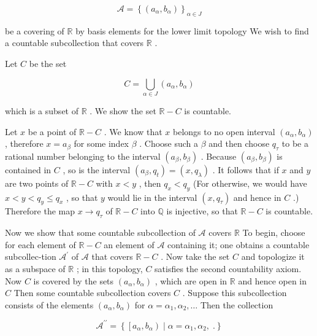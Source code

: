 \[
\mathcal{A} = {\left\{  \left( {a}_{\alpha },{b}_{\alpha }\right) \right\}  }_{\alpha  \in  J}
\]

be a covering of \(\mathbb{R}\) by basis elements for the lower limit topology We wish to find a countable subcollection that covers \(\mathbb{R}\) .

Let \(C\) be the set

\[
C = \mathop{\bigcup }\limits_{{\alpha  \in  J}}\left( {{a}_{\alpha },{b}_{\alpha }}\right)
\]

which is a subset of \(\mathbb{R}\) . We show the set \(\mathbb{R} - C\) is countable.

Let \(x\) be a point of \(\mathbb{R} - C\) . We know that \(x\) belongs to no open interval \(\left( {{a}_{\alpha },{b}_{\alpha }}\right)\) , therefore \(x = {a}_{\beta }\) for some index \(\beta\) . Choose such a \(\beta\) and then choose \({q}_{\tau }\) to be a rational number belonging to the interval \(\left( {{a}_{\beta },{b}_{\beta }}\right)\) . Because \(\left( {{a}_{\beta },{b}_{\beta }}\right)\) is contained in \(C\) , so is the interval \(\left( {{a}_{\beta },{q}_{t}}\right)  = \left( {x,{q}_{\lambda }}\right)\) . It follows that if \(x\) and \(y\) are two points of \(\mathbb{R} - C\) with \(x < y\) , then \({q}_{x} < {q}_{y}\) (For otherwise, we would have \(x < y < {q}_{y} \leq  {q}_{x}\) , so that \(y\) would lie in the interval \(\left( {x,{q}_{\tau }}\right)\) and hence in \(C\) .) Therefore the map \(x \rightarrow  {q}_{\tau }\) of \(\mathbb{R} - C\) into \(\mathbb{Q}\) is injective, so that \(\mathbb{R} - C\) is countable.

Now we show that some countable subcollection of \(\mathcal{A}\) covers \(\mathbb{R}\) To begin, choose for each element of \(\mathbb{R} - C\) an element of \(\mathcal{A}\) containing it; one obtains a countable subcollec-tion \({\mathcal{A}}^{\prime }\) of \(\mathcal{A}\) that covers \(\mathbb{R} - C\) . Now take the set \(C\) and topologize it as a subspace of \(\mathbb{R}\) ; in this topology, \(C\) satisfies the second countability axiom. Now \(C\) is covered by the sets \(\left( {{a}_{\alpha },{b}_{\alpha }}\right)\) , which are open in \(\mathbb{R}\) and hence open in \(C\) Then some countable subcollection covers \(C\) . Suppose this subcollection consists of the elements \(\left( {{a}_{\alpha },{b}_{\alpha }}\right)\) for \(\alpha  = {\alpha }_{1},{\alpha }_{2},\ldots\) Then the collection

\[
{\mathcal{A}}^{\prime \prime } = \left\{  {\left\lbrack  {{a}_{\alpha },{b}_{\alpha }}\right)  \mid  \alpha  = {\alpha }_{1},{\alpha }_{2},\;.}\right\}
\]

